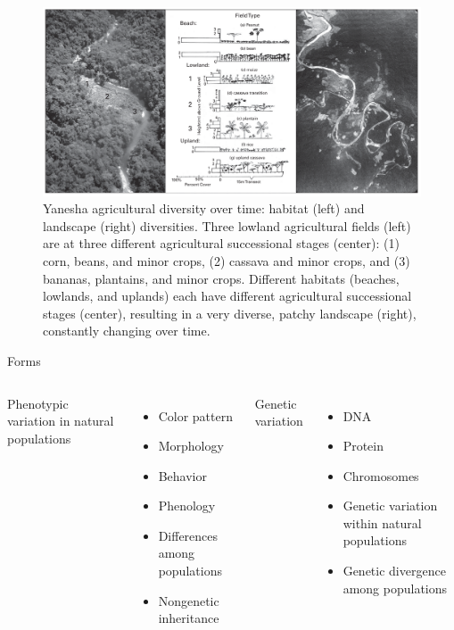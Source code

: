 \documentclass[ignorenonframetext,aspectratio=169]{beamer}
\begin{document}
\begin{frame}{}
\protect\hypertarget{section-6}{}

\begin{figure}
\includegraphics[width=0.7\linewidth]{./../images/yanesha_habitat_landscape_diversity} \caption{Yanesha agricultural diversity over time: habitat (left) and landscape (right) diversities. Three lowland agricultural fields (left) are at three different agricultural successional stages (center): (1) corn, beans, and minor crops, (2) cassava and minor crops, and (3) bananas, plantains, and minor crops. Different habitats (beaches, lowlands, and uplands) each have different agricultural successional stages (center), resulting in a very diverse, patchy landscape (right), constantly changing over time.}\label{fig:habitat-landscape}
\end{figure}

\end{frame}

\begin{frame}{Forms}
\protect\hypertarget{forms}{}

\begin{columns}[T,onlytextwidth]
  
  \alert{Phenotypic variation in natural populations}
  \begin{itemize}
  \item Color pattern
  \item Morphology
  \item Behavior
  \item Phenology
  \item Differences among populations
  \item Nongenetic inheritance
  \end{itemize}

  \alert{Genetic variation}
  \begin{itemize}
  \item DNA
  \item Protein
  \item Chromosomes
  \item Genetic variation within natural populations
  \item Genetic divergence among populations
  \end{itemize}

\end{columns}

\end{frame}
\end{document}
